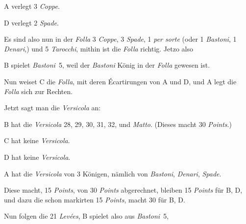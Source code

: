 \documentclass[11pt,a6paper,twoside]{article}
\begin{document}
A verlegt 3 \textit{Coppe}.

D verlegt 2 \textit{Spade}.

Es sind also nun in der \textit{Folla} 3 \textit{Coppe}, 3 \textit{Spade}, 1 \textit{per sorte} (oder 1 \textit{Bastoni}, 1 \textit{Denari},) und 5 \textit{Tarocchi}, mithin ist die \textit{Folla} richtig. Jetzo also



B spielet \textit{Bastoni}~5, weil der \textit{Bastoni} König in der \textit{Folla} gewesen ist.

Nun weiset C die \textit{Folla}, mit deren Écartirungen von A und D, und A legt die \textit{Folla} sich zur Rechten.

Jetzt sagt man die \textit{Versicola} an:

B hat die \textit{Versicola} 28, 29, 30, 31, 32, und \textit{Matto}. (Dieses macht 30 \textit{Points}.)

C hat keine \textit{Versicola}.

D hat keine \textit{Versicola}.

A hat die \textit{Versicola} von 3 Königen, nämlich von \textit{Bastoni}, \textit{Denari}, \textit{Spade}.

Diese macht, 15 \textit{Points}, von 30 \textit{Points} abgerechnet, bleiben 15 \textit{Points} für B, D, und dazu die schon markirten 15 \textit{Points}, macht 30 für B, D.

Nun folgen die 21 \textit{Levées}, B spielet also aus \textit{Bastoni}~5,
\end{document}
